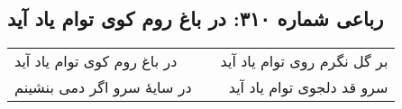 \begin{center}
\section*{رباعی شماره ۳۱۰: در باغ روم کوی توام یاد آید}
\label{sec:sh310}
\begin{longtable}{l p{0.5cm} r}
در باغ روم کوی توام یاد آید
&&
بر گل نگرم روی توام یاد آید
\\
در سایهٔ سرو اگر دمی بنشینم
&&
سرو قد دلجوی توام یاد آید
\\
\end{longtable}
\end{center}
